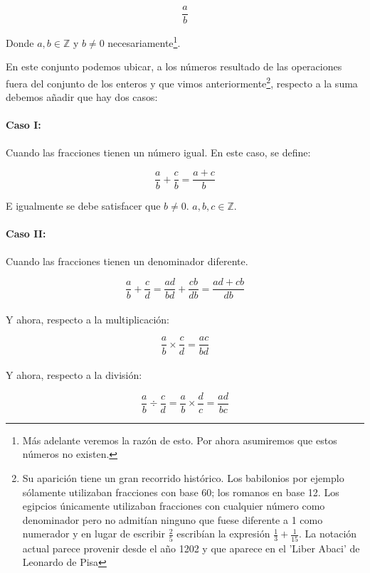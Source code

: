 \documentclass{article}
\begin{document}
$$\frac{a}{b}$$

Donde $a, b \in \mathbb{Z}$ y $b \neq 0$ necesariamente\footnote{Más adelante veremos la razón de esto. Por ahora asumiremos que estos números no existen.}.

En este conjunto podemos ubicar, a los números resultado de las operaciones fuera del conjunto de los enteros y que vimos anteriormente\footnote{Su aparición tiene un gran recorrido histórico. Los babilonios por ejemplo sólamente utilizaban fracciones con base 60; los romanos en base 12. Los egipcios únicamente utilizaban fracciones con cualquier número como denominador pero no admitían ninguno que fuese diferente a 1 como numerador y en lugar de escribir $\frac{2}{5}$ escribían la expresión $\frac{1}{3} + \frac{1}{15}$. La notación actual parece provenir desde el año 1202 y que aparece en el 'Liber Abaci' de Leonardo de Pisa\cite{patino_duque_1977}}, respecto a la suma debemos añadir que hay dos casos:

\paragraph{Caso I:} Cuando las fracciones tienen un número igual. En este caso, se define:

$$\frac{a}{b} + \frac{c}{b} = \frac{a + c}{b}$$

E igualmente se debe satisfacer que $b \neq 0$. $a, b, c \in \mathbb{Z}$.

\paragraph{Caso II:} Cuando las fracciones tienen un denominador diferente.

$$\frac{a}{b} + \frac{c}{d} = \frac{ad}{bd} + \frac{cb}{db} = \frac{ad + cb}{db}$$

\paragraph{} Y ahora, respecto a la multiplicación:

$$\frac{a}{b} \times \frac{c}{d} = \frac{ac}{bd}$$

\paragraph{} Y ahora, respecto a la división:

$$\frac{a}{b} \div \frac{c}{d} = \frac{a}{b} \times \frac{d}{c} = \frac{ad}{bc}$$
\end{document}
